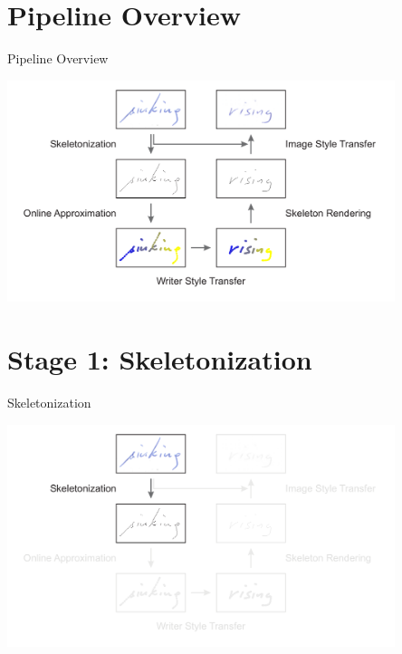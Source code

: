\documentclass[aspectratio=169]{beamer}
\begin{document}
\section{Pipeline Overview}
\begin{frame}{Pipeline Overview}
\begin{center}
\vspace{-1em}
\includegraphics[width=0.85\textwidth]{../thesis/assets/pipeline.pdf}
\end{center}
\end{frame}



\section{Stage 1: Skeletonization}
\begin{frame}{Skeletonization}
\begin{center}
\vspace{-1em}
\includegraphics[width=0.85\textwidth]{assets/pipeline/pipeline_skeletonization.pdf}
\end{center}
\end{frame}
\end{document}
